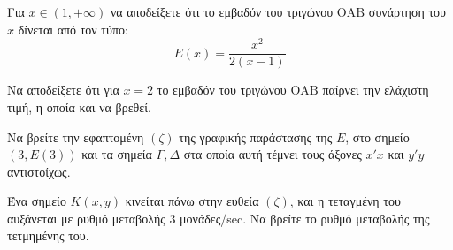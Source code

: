\begin{alist}
\item Για \(x \in (1, +\infty)\) να αποδείξετε ότι το εμβαδόν του τριγώνου \(\mathrm{OAB}\) συνάρτηση του \(x\) δίνεται από τον τύπο:
    \[ E(x) = \frac{x^2}{2(x-1)} \] 
\item Να αποδείξετε ότι για \(x=2\) το εμβαδόν του τριγώνου \(\mathrm{OAB}\) παίρνει την ελάχιστη τιμή, η οποία και να βρεθεί. 
\item Να βρείτε την εφαπτομένη \((\zeta)\) της γραφικής παράστασης της \(E\), στο σημείο \((3,E(3))\) και τα σημεία \(\Gamma, \Delta\) στα οποία αυτή τέμνει τους άξονες \(x'x\) και \(y'y\) αντιστοίχως. 
\item Ένα σημείο \(K(x,y)\) κινείται πάνω στην ευθεία \((\zeta)\), και η τεταγμένη του αυξάνεται με ρυθμό μεταβολής \(3\) μονάδες/sec. Να βρείτε το ρυθμό μεταβολής της τετμημένης του. 
\end{alist}